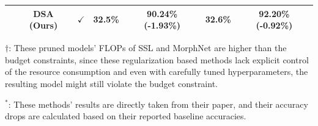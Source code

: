 \documentclass[runningheads]{llncs}
\begin{document}
\begin{table}[H]
\begin{center}
{\begin{tabular}{ccccccc}
    \multicolumn{1}{c|}{} & DSA (Ours)           &  $\checkmark$    & 32.5\%  & \textbf{90.24\% (-1.93\%)} & 32.6\% & \textbf{92.20\% (-0.92\%)} \\ \bottomrule
    \end{tabular}
    }
    \begin{minipage}{0.98\textwidth}
      $\dagger$: These pruned models' FLOPs of SSL and MorphNet are higher than the budget constraints, since
      these regularization based methods lack explicit control of the resource consumption and even with carefully tuned hyperparameters, the resulting model might still violate the budget constraint. 
      
      $^*$: These methods' results are directly taken from their paper, and their accuracy drops are calculated based on their reported baseline accuracies.
    \end{minipage}
    \end{center}
    \end{table}
\end{document}
